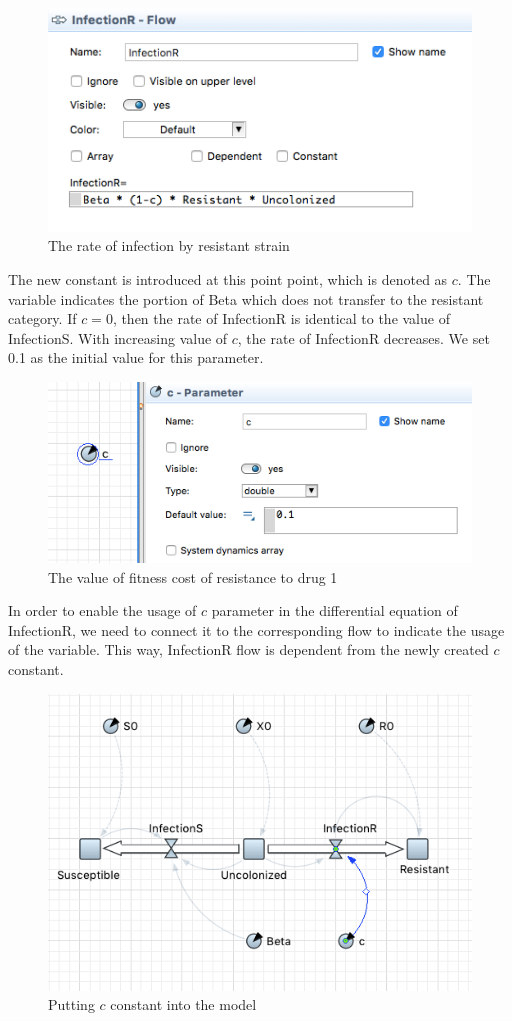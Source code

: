 \begin{figure}[H]
  \centering
  \includegraphics[height=0.4\textwidth]{img/screens/basic/basic16}
  \caption{The rate of infection by resistant strain}
\end{figure}

The new constant is introduced at this point point, which is denoted as $c$. The variable indicates the portion of Beta which does not transfer to the resistant category. If $c = 0$, then the rate of InfectionR is identical to the value of InfectionS. With increasing value of $c$, the rate of InfectionR decreases. We set 0.1 as the initial value for this parameter.

\begin{figure}[H]
  \centering
  \includegraphics[height=0.4\textwidth]{img/screens/basic/basic18}
  \caption{The value of fitness cost of resistance to drug 1}
\end{figure}

In order to enable the usage of $c$ parameter in the differential equation of InfectionR, we need to connect it to the corresponding flow to indicate the usage of the variable. This way, InfectionR flow is dependent from the newly created $c$ constant.

\begin{figure}[H]
  \centering
  \includegraphics[height=0.5\textwidth]{img/screens/basic/basic19}
  \caption{Putting $c$ constant into the model}
\end{figure}

